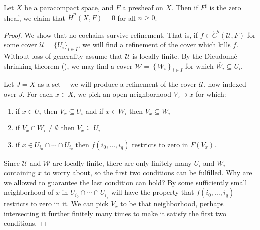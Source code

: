 \documentclass[11pt]{book}
\begin{document}
\begin{lemma}\label{lem:presheaf-sheafifying-to-zero-has-no-cohomology} 
Let $X$ be a paracompact space, and $F$ a presheaf on $X$. Then if $F^\sharp$ is the zero sheaf, we claim that $\check{H}^n(X,F) = 0$ for all $n\ge0$.
\end{lemma}
\begin{proof} We show that no cochains survive refinement. That is, if $f \in \check{C}^q(\mathcal{U},F)$ for some cover $\mathcal{U} = \{U_i\}_{i\in I}$, we will find a refinement of the cover which kills $f$. Without loss of generality assume that $\mathcal{U}$ is locally finite. By the Dieudonn\'e shrinking theorem (), we may find a cover $\mathcal{W} = \left\{ W_i \right\}_{i\in I}$ for which $\overline{W_i} \subseteq U_i$.

Let $J = X$ as a set--- we will produce a refinement of the cover $\mathcal{U}$, now indexed over $J$. For each $x\in X$, we pick an open neighborhood $V_x \ni x$ for which:
\begin{enumerate}
    \item if $x\in U_i$ then $V_x \subseteq U_i$ and if $x\in W_i$ then $V_x \subseteq W_i$
    \item if $V_x \cap W_i \ne \emptyset$ then $V_x \subseteq U_i$
    \item if $x\in U_{i_0} \cap \cdots \cap U_{i_q}$ then $f(i_0, \ldots, i_q)$ restricts to zero in $F(V_x)$.
\end{enumerate}
Since $\mathcal{U}$ and $\mathcal{W}$ are locally finite, there are only finitely many $U_i$ and $W_i$ containing $x$ to worry about, so the first two conditions can be fulfilled. Why are we allowed to guarantee the last condition can hold? By  some sufficiently small neighborhood of $x$ in $U_{i_0} \cap \cdots \cap U_{i_q}$ will have the property that $f(i_0, \ldots, i_q)$ restricts to zero in it. We can pick $V_x$ to be that neighborhood, perhaps intersecting it further finitely many times to make it satisfy the first two conditions.


\end{proof}
\end{document}
